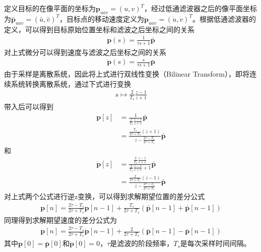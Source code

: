 定义目标的在像平面的坐标为$\mathbf{p}_{uav} = (u, v)^T$，经过低通滤波器之后的像平面坐标为$\bar{\mathbf{p}}_{uav} = (\bar{u}, \bar{v})^T$，目标点的移动速度定义为$\dot{\mathbf{p}}_{uav} = (\dot{u},\dot{v})^T$。根据低通滤波器的定义，可以得到目标原始位置坐标和滤波之后坐标之间的关系
\begin{align}
\mathbf{p}(s) = \frac{1}{\tau s+1}\bar{\mathbf{p}}
\end{align}
对上式微分可以得到速度与滤波之后坐标之间的关系
\begin{align}
\dot{\mathbf{p}}(s) = \frac{s}{\tau s+1}\bar{\mathbf{p}}
\end{align}
由于采样是离散系统，因此将上式进行双线性变换（Bilinear Transform）\cite{franklin1998digital}，即将连续系统转换离散系统，通过下式进行变换
\begin{align}
s \mapsto \frac{2}{T_s}\frac{z-1}{z+1}
\end{align}
带入后可以得到
\begin{align}
\mathbf{p}[z] &= \frac{1}{\frac{2}{T_s}\frac{z-1}{z+1}}\bar{\mathbf{p}} \\
&= \frac{\frac{T_s}{2\tau+T_s}(z+1)}{z-\frac{2\tau-T_s}{2\tau+T_s}}\bar{\mathbf{p}}
\end{align}
和
\begin{align}
\dot{\mathbf{p}}[z] &= \frac{\frac{2}{T_s}\frac{z-1}{z+1}}{\frac{2}{T_s}\frac{z-1}{z+1}+1}\bar{\mathbf{p}} \\
&= \frac{\frac{2}{2\tau+T_s}(z-1)}{z-\frac{2\tau-T_s}{2\tau+T_s}}\bar{\mathbf{p}}
\end{align}
对上式两个公式进行逆z变换，可以得到求解期望位置的差分公式
\begin{align}
\mathbf{p}[n] = \frac{2\tau-T_s}{2\tau+T_s} \mathbf{p}[n-1]+ \frac{T_s}{2\tau+T_s}(\bar{\mathbf{p}}[n-1] + \bar{\mathbf{p}}[n-1] )
\end{align}
同理得到求解期望速度的差分公式为
\begin{align}
\dot{\mathbf{p}}[n] = \frac{2\tau-T_s}{2\tau+T_s}\dot{\mathbf{p}}[n-1]+ \frac{2}{2\tau+T_s}(\bar{\mathbf{p}}[n-1] - \bar{\mathbf{p}}[n-1] )
\end{align}
其中$\mathbf{p}[0] = \bar{\mathbf{p}}[0]$和$\dot{\mathbf{p}}[0] = 0$，$\tau$是滤波的阶段频率，$T_s$是每次采样时间间隔。


